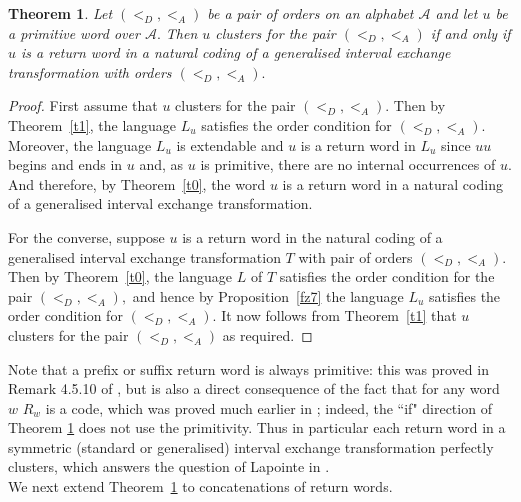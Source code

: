\documentclass[12pt,a4paper]{amsart}
\newtheorem{theorem}{Theorem}
\begin{document}
\begin{theorem}\label{simple} Let $(<_D, <_A)$ be a pair of orders on an alphabet $\mathcal A$ and let $u$ be a primitive word over $\mathcal A.$ Then $u$ clusters for the pair $(<_D, <_A)$ if and only if $u$ is a return word in a natural coding of a generalised interval exchange transformation with orders $(<_D, <_A).$ \end{theorem}
 \begin{proof} 
  First assume that $u$ clusters for the pair $(<_D, <_A).$ Then by Theorem~\ref{t1}, the language $L_u$ satisfies the order condition for $(<_D, <_A).$ Moreover,  the language $L_u$ is extendable and $u$ is a return word in $L_u$ since $uu$ begins and ends in $u$ and, as $u$ is primitive, there are no internal occurrences of $u.$ And therefore, by Theorem~\ref{t0}, the word $u$ is a return word in a natural coding of a generalised interval exchange transformation. 
 
 For the converse, suppose $u$ is a return word in the natural coding of a generalised  interval exchange transformation $T$ with pair of orders $(<_D, <_A).$  Then by Theorem~\ref{t0}, the language $L$ of $T$ satisfies the
 order condition for the pair   $(<_D, <_A),$  and hence by Proposition~\ref{fz7} the language  $L_u$ satisfies the order condition for $(<_D,<_A). $ It now follows from Theorem~\ref{t1} that $u$ clusters for the pair $(<_D,<_A)$ as required. \end{proof} 
 
Note that a prefix or suffix return word is always primitive: this was proved in Remark 4.5.10 of \cite{casn}, but is also  a direct consequence of the fact that for any word $w$ $R_w$ is a code, which was proved much earlier in \cite{dhs}; indeed, the ``if" direction of Theorem \ref{simple} does not use the  primitivity. Thus in particular each return word in a symmetric (standard or generalised)  interval exchange transformation perfectly clusters, which  answers the question of Lapointe in \cite{lap}.\\
 

 
 

We next extend Theorem~\ref{simple} to concatenations of return words.
\end{document}
